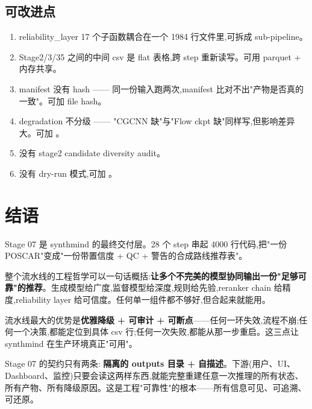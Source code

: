\subsection{可改进点}

\begin{enumerate}[label=(\alph*)]
    \item reliability\_layer 17 个子函数耦合在一个 1984 行文件里,可拆成 sub-pipeline。
    \item Stage2/3/35 之间的中间 csv 是 flat 表格,跨 step 重新读写。可用 parquet + 内存共享。
    \item manifest 没有 hash —— 同一份输入跑两次,manifest 比对不出"产物是否真的一致"。可加 file hash。
    \item degradation 不分级 —— "CGCNN 缺"与"Flow ckpt 缺"同样写,但影响差异大。可加 。
    \item 没有 stage2 candidate diversity audit。
    \item 没有 dry-run 模式,可加 。
\end{enumerate}

\section{结语}

Stage 07 是 synthmind 的最终交付层。28 个 step 串起 4000 行代码,把"一份 POSCAR"变成"一份带置信度 + QC + 警告的合成路线推荐表"。

整个流水线的工程哲学可以一句话概括:\textbf{让多个不完美的模型协同输出一份"足够可靠"的推荐}。生成模型给广度,监督模型给深度,规则给先验,reranker chain 给精度,reliability layer 给可信度。任何单一组件都不够好,但合起来就能用。

流水线最大的优势是\textbf{优雅降级 + 可审计 + 可断点}——任何一环失效,流程不崩;任何一个决策,都能定位到具体 csv 行;任何一次失败,都能从那一步重启。这三点让 synthmind 在生产环境真正"可用"。

Stage 07 的契约只有两条:\textbf{ 隔离的 outputs 目录 +  自描述}。下游(用户、UI、Dashboard、监控)只要会读这两样东西,就能完整重建任意一次推理的所有状态、所有产物、所有降级原因。这是工程"可靠性"的根本——所有信息可见、可追溯、可还原。
